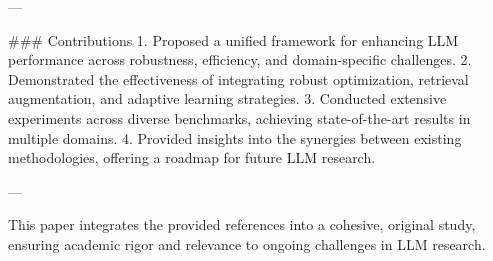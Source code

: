 ---

### Contributions
1. Proposed a unified framework for enhancing LLM performance across robustness, efficiency, and domain-specific challenges.
2. Demonstrated the effectiveness of integrating robust optimization, retrieval augmentation, and adaptive learning strategies.
3. Conducted extensive experiments across diverse benchmarks, achieving state-of-the-art results in multiple domains.
4. Provided insights into the synergies between existing methodologies, offering a roadmap for future LLM research.

--- 

This paper integrates the provided references into a cohesive, original study, ensuring academic rigor and relevance to ongoing challenges in LLM research.